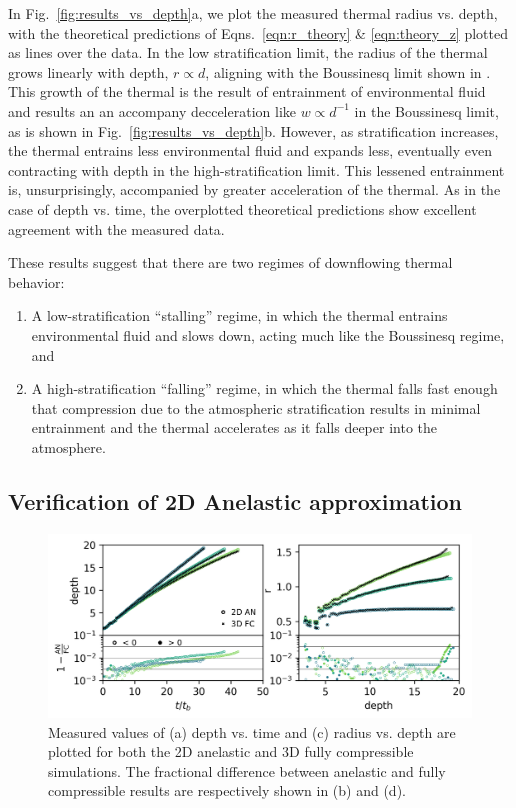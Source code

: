 \documentclass[twocolumn, amsmath, amsfonts, amssymb, trackchanges]{aastex62}
\begin{document}
In Fig.~\ref{fig:results_vs_depth}a, we plot the measured thermal radius vs. depth, with the theoretical predictions of Eqns.~\ref{eqn:r_theory} \& \ref{eqn:theory_z} plotted as lines over the data. 
In the low stratification limit, the radius of the thermal grows linearly with depth, $r \propto d$, aligning with the Boussinesq limit shown in \citet{lecoanet&jeevanjee2018}.
This growth of the thermal is the result of entrainment of environmental fluid and results an an accompany decceleration like $w \propto d^{-1}$ in the Boussinesq limit, as is shown in Fig.~\ref{fig:results_vs_depth}b.
However, as stratification increases, the thermal entrains less environmental fluid and expands less, eventually even contracting with depth in the high-stratification limit. 
This lessened entrainment is, unsurprisingly, accompanied by greater acceleration of the thermal.
As in the case of depth vs. time, the overplotted theoretical predictions show excellent agreement with the measured data.

These results suggest that there are two regimes of downflowing thermal behavior:
\begin{enumerate}
\item A low-stratification ``stalling'' regime, in which the thermal entrains environmental fluid and slows down, acting much like the Boussinesq regime, and
\item A high-stratification ``falling'' regime, in which the thermal falls fast enough that compression due to the atmospheric stratification results in minimal entrainment and the thermal accelerates as it falls deeper into the atmosphere.
\end{enumerate}

\subsection{Verification of 2D Anelastic approximation}
\begin{figure}[t!]
    \includegraphics[width=\textwidth]{diff_AN_FC.png}
    \caption{
	Measured values of (a) depth vs. time and (c) radius vs. depth are plotted for both the 2D anelastic and 3D fully compressible simulations. 
	The fractional difference between anelastic and fully compressible results are respectively shown in (b) and (d).
    \label{fig:diff} }
\end{figure}
\end{document}
